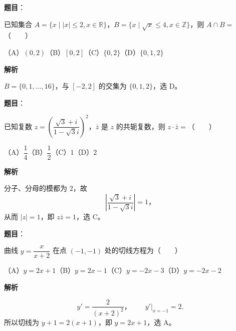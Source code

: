 

\begin{answer}

\textbf{题目}：

已知集合 $A=\{x\mid |x|\leq2, x\in\mathbb R\}$，$B=\{x\mid \sqrt{x}\leq4, x\in\mathbb Z\}$，则 $A\cap B=$\mbox{（　　）}

（A）$(0,2)$\quad（B）$[0,2]$\quad（C）$\{0,2\}$\quad（D）$\{0,1,2\}$

\textbf{解析}

$B=\{0,1,\ldots,16\}$，与 $[-2,2]$ 的交集为 $\{0,1,2\}$，选 D。


\end{answer}
\begin{answer}

\textbf{题目}：

已知复数 $z=\left(\dfrac{\sqrt3+i}{1-\sqrt3i}\right)^2$，$\bar z$ 是 $z$ 的共轭复数，则 $z\cdot\bar z=$\mbox{（　　）}

（A）$\dfrac14$\quad（B）$\dfrac12$\quad（C）$1$\quad（D）$2$

\textbf{解析}

分子、分母的模都为 $2$，故
\nopagebreak[4]
\[
\left|\frac{\sqrt3+i}{1-\sqrt3i}\right|=1\text{，}
\]
从而 $|z|=1$，即 $z\bar z=1$，选 C。


\end{answer}
\begin{answer}

\textbf{题目}：

曲线 $y=\dfrac{x}{x+2}$ 在点 $(-1,-1)$ 处的切线方程为\mbox{（　　）}

（A）$y=2x+1$\quad（B）$y=2x-1$\quad（C）$y=-2x-3$\quad（D）$y=-2x-2$

\textbf{解析}

\nopagebreak[4]
\[
y'=\frac2{(x+2)^2}\text{，}\qquad y'\big|_{x=-1}=2.
\]
所以切线为 $y+1=2(x+1)$，即 $y=2x+1$，选 A。


\end{answer}
